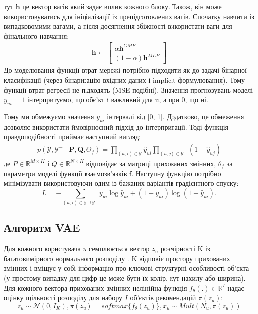 тут $\mathbf{h}$ це вектор вагів який задає вплив кожного блоку. Також, він може використовуватись для ініціалізації із препідготовлених вагів. Спочатку навчити із випадковомими вагами, а після досягнення збіжності використати ваги для фінального навчання:
\begin{align*}
    \mathbf{h} \leftarrow\left[\begin{array}{c}
                                       \alpha \mathbf{h}^{G M F} \\
                                       (1-\alpha) \mathbf{h}^{M L P}
                                   \end{array}\right]
\end{align*}
До моделювання функції втрат мережі потрібно підходити як до задачі бінарної класифікації (через бінаризацію вхідних даних і implicit формулювання). Тому функції втрат регресії не підходять (MSE  подібні). Значення прогнозувань моделі $y_{u i}=1$ інтерпритуємо, що обє’кт i важливий для u, а при 0, що ні.

Тому ми обмежуємо значення $y_{ui}$ інтервалі від [0, 1]. Додатково, це обмеження дозволяє використати ймовірносний підхід до інтерпритації.
Тоді функція правдоподібності приймає наступний вигляд:
\begin{align}
    p(\mathcal{Y}, \mathcal{Y}^{-} \mid \mathbf{P}, \mathbf{Q}, \Theta_f)=\prod_{(u, i) \in \mathcal{Y}} \hat{y}_{u i} \prod_{(u, j) \in \mathcal{Y}^{-}}(1-\hat{y}_{u j})
\end{align}
де $P \in \mathbb{R}^{M \times  K}$ і $Q \in \mathbb{R}^{N \times K}$ відповідає за матриці прихованих змінних, $\theta_{f}$ за параметри моделі функції взаємозв’язків f.
Наступну функцію потрібно мінімізувати використовуючи одим із бажаних варіантів градієнтного спуску:
\[
    L =-\sum_{(u, i) \in \mathcal{Y} \cup \mathcal{Y}^{-}} y_{u i} \log \hat{y}_{u i}+\left(1-y_{u i}\right) \log \left(1-\hat{y}_{u i}\right) .
\]
\subsection{Алгоритм VAE}

Для кожного користувача $u$ семплюється вектор $z_{u}$ розмірності K із багатовимірного нормального розподілу . K відповіє простору прихованих змінних і вміщує у собі інформацію про ключові структурні особливості об’єкта (у простому випадку для цифр це може бути їх колір, кут нахилу або ширина).
Для кожного вектора прихованих змінних нелінійна функція $f_{\theta}(.) \in \mathbb{R}^{I}$ надає оцінку щільності розподілу для набору  $I$ об’єктів рекомендацій $\pi(z_{u})$:
\begin{equation}
    z_u \sim \mathcal{N}(0, I_K), \pi(z_u) = softmax\{f_\theta(z_u)\}, x_u \sim Mult(N_u, \pi(z_u))
\end{equation}


